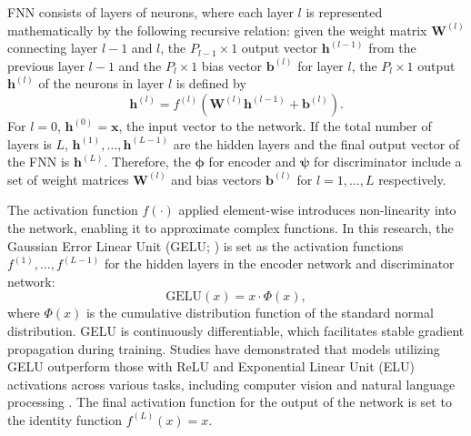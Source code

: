 \documentclass[a4paper,12pt]{article}
\theoremstyle{plain} %
\theoremstyle{remark} %
\theoremstyle{definition} %
\begin{document}
FNN consists of layers of neurons, where each layer 
$l$ is represented mathematically by the following recursive relation: given the weight matrix $\bm{W}^{(l)}$ connecting layer $l-1$ and $l$, the $P_{l-1}\times1$ output vector $\bm{h}^{(l-1)}$ from the previous layer $l-1$ and the $P_l\times1$ bias vector $\bm{b}^{(l)}$ for layer $l$, the $P_{l}\times1$ output $\bm{h}^{(l)}$ of the neurons in layer $l$ is defined by
\begin{equation}\label{eq:fnn}
    \bm{h}^{(l)} = f^{(l)}(\bm{W}^{(l)}\bm{h}^{(l-1)}+\bm{b}^{(l)}).
\end{equation}
For $l=0$, $\bm{h}^{(0)}=\bm{x}$, the input vector to the network. If the total number of layers is $L$, $\bm{h}^{(1)},\dots,\bm{h}^{(L-1)}$ are the hidden layers and the final output vector of the FNN is $\bm{h}^{(L)}$. Therefore, the $\bm{\phi}$ for encoder and $\bm{\psi}$ for discriminator include a set of weight matrices $\bm{W}^{(l)}$ and bias vectors $\bm{b}^{(l)}$ for $l=1,\dots,L$ respectively.

The activation function $f(\cdot)$ applied element-wise introduces non-linearity into the network, enabling it to approximate complex functions. In this research, the Gaussian Error Linear Unit (GELU; \citealp{hendrycks2016gaussian}) is set as the activation functions $f^{(1)},\dots,f^{(L-1)}$ for the hidden layers in the encoder network and discriminator network:
\begin{equation}\label{eq:glu}
    \text{GELU}(x) = x \cdot \Phi(x),
\end{equation}
where $\Phi(x)$ is the cumulative distribution function of the standard normal distribution. GELU is continuously differentiable, which facilitates stable gradient propagation during training. Studies have demonstrated that models utilizing GELU outperform those with ReLU and Exponential Linear Unit (ELU) activations across various tasks, including computer vision and natural language processing \citep{hendrycks2016gaussian}. The final activation function for the output of the network is set to the identity function $f^{(L)}(x)=x$.
\end{document}
